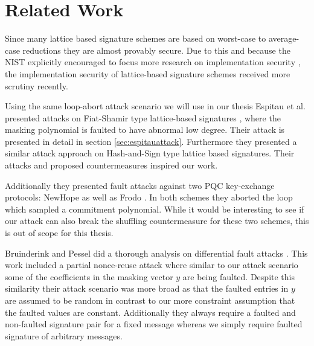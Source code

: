 %
\chapter{Related Work}
\label{sec:related}

Since many lattice based signature schemes are based on worst-case to average-case reductions \cite{sis} they are almost provably secure. Due to this and because the NIST explicitly encouraged to focus more research on implementation security \cite{nistcall,nistsecond}, the implementation security of lattice-based signature schemes received more scrutiny recently.


Using the same loop-abort attack scenario we will use in our thesis Espitau et al. presented attacks on Fiat-Shamir type lattice-based signatures  \cite{espitau}, where the masking polynomial is faulted to have abnormal low degree. Their attack is presented in detail in section \ref{sec:espitauattack}. Furthermore they presented a similar attack approach on Hash-and-Sign type lattice based signatures.
Their attacks and proposed countermeasures inspired our work.

Additionally they presented fault attacks against two PQC key-exchange protocols: NewHope as well as Frodo \cite{espitau_kem}. In both schemes they aborted the loop which sampled a commitment polynomial. While it would be interesting to see if our attack can also break the shuffling countermeasure for these two schemes, this is out of scope for this thesis.



Bruinderink and Pessel did a thorough analysis on differential fault attacks  \cite{Groot_Bruinderink_Pessl_2018}. This work included a partial nonce-reuse attack where similar to our attack scenario some of the coefficients in the masking vector $y$ are being faulted. Despite this similarity their attack scenario was more broad as that the faulted entries in $y$ are assumed to be random in contrast to our more constraint assumption that the faulted values are constant. Additionally they always require a faulted and non-faulted signature pair for a fixed message whereas we simply require faulted signature of arbitrary messages.



